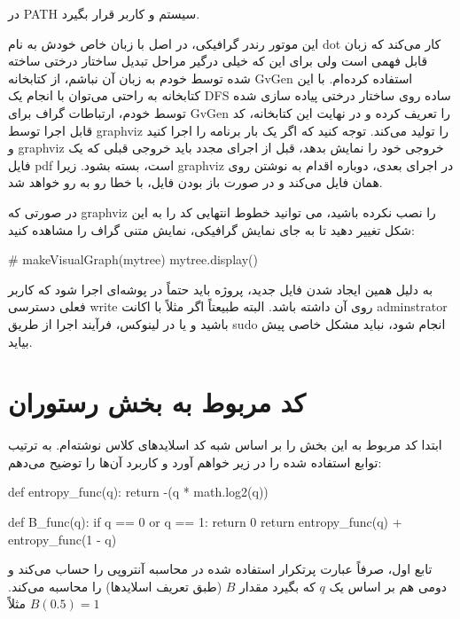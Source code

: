 \documentclass[12pt,titlepage,a4page , tikz , multi,table , svgnames,xcdraw]{article}
\begin{document}
در PATH سیستم و کاربر قرار بگیرد.

این موتور رندر گرافیکی، در اصل با زبان خاص خودش به نام dot کار می‌کند که زبان قابل فهمی است ولی برای این که خیلی درگیر مراحل تبدیل ساختار درختی ساخته شده توسط خودم به زبان آن نباشم، از کتابخانه GvGen استفاده کرده‌ام. با این کتابخانه به راحتی می‌توان با انجام یک DFS ساده روی ساختار درختی پیاده سازی شده توسط خودم، ارتباطات گراف برای GvGen را تعریف کرده و در نهایت این کتابخانه، کد قابل اجرا توسط graphviz را تولید می‌کند. توجه کنید که اگر یک بار برنامه را اجرا کنید و graphviz خروجی خود را نمایش بدهد، قبل از اجرای مجدد باید خروجی قبلی که یک فایل pdf است، بسته بشود. زیرا graphviz در اجرای بعدی، دوباره اقدام به نوشتن روی همان فایل می‌کند و در صورت باز بودن فایل، با خطا رو به رو خواهد شد.

در صورتی که graphviz را نصب نکرده باشید، می توانید خطوط انتهایی کد را به این شکل تغییر دهید تا به جای نمایش گرافیکی،‌ نمایش متنی گراف را مشاهده کنید:


\begin{latin}
\begin{python}

# makeVisualGraph(mytree)
mytree.display()

\end{python}
\end{latin}


به دلیل همین ایجاد شدن فایل جدید، پروژه باید حتماً در پوشه‌ای اجرا شود که کاربر فعلی دسترسی write روی آن داشته باشد. البته طبیعتاً اگر مثلاً با اکانت adminstrator باشید و یا در لینوکس، فرآیند اجرا از طریق sudo انجام شود، نباید مشکل خاصی پیش بیاید.


\newpage

\section{کد مربوط به بخش رستوران}
ابتدا کد مربوط به این بخش را بر اساس شبه کد اسلایدهای کلاس نوشته‌ام. به ترتیب توابع استفاده شده را در زیر خواهم آورد و کاربرد آن‌ها را توضیح می‌دهم:

\begin{latin}
\begin{python}
def entropy_func(q):
    return -(q * math.log2(q))


def B_func(q):
    if q == 0 or q == 1:
        return 0
    return entropy_func(q) + entropy_func(1 - q)
\end{python}

\end{latin}

تابع اول، صرفاً عبارت پرتکرار استفاده شده در محاسبه آنتروپی را حساب می‌کند و دومی هم بر اساس یک $q$ که بگیرد مقدار $B$ (طبق تعریف اسلایدها) را محاسبه می‌کند. مثلاً $B(0.5)=1$
\end{document}
